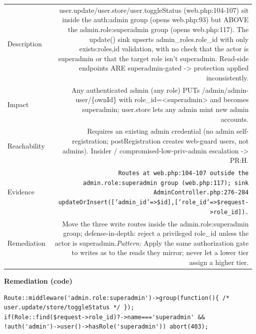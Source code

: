 \documentclass[11pt,a4paper]{article}
\begin{document}
{\renewcommand{\arraystretch}{1.35}%
\begin{tabularx}{\textwidth}{L R}
\toprule
Description & user.update/user.store/user.toggleStatus (web.php:104-107) sit inside the auth:admin group (opens web.php:93) but ABOVE the admin.role:superadmin group (opens web.php:117). The update() sink upserts admin\_roles.role\_id with only exists:roles,id validation, with no check that the actor is superadmin or that the target role isn't superadmin. Read-side endpoints ARE superadmin-gated -\textgreater{} protection applied inconsistently. \\
Impact & Any authenticated admin (any role) PUTs /admin/admin-user/\{ownId\} with role\_id=\textless{}superadmin\textgreater{} and becomes superadmin; user.store lets any admin mint new admin accounts. \\
Reachability & Requires an existing admin credential (no admin self-registration; postRegistration creates web-guard users, not admins). Insider / compromised-low-priv-admin escalation -\textgreater{} PR:H. \\
Evidence & \texttt{\small Routes at web.php:104-107 outside the admin.role:superadmin group (web.php:117); sink AdminController.php:276-284 updateOrInsert(['admin\_id'=\textgreater{}\$id],['role\_id'=\textgreater{}\$request-\textgreater{}role\_id]).} \\
Remediation & Move the three write routes inside the admin.role:superadmin group; defense-in-depth: reject a privileged role\_id unless the actor is superadmin.\newline\emph{Pattern:} Apply the same authorization gate to writes as to the reads they mirror; never let a lower tier assign a higher tier. \\
\bottomrule
\end{tabularx}}

\vspace{4pt}\noindent\textbf{Remediation (code)}\par
\begin{lstlisting}
Route::middleware('admin.role:superadmin')->group(function(){ /* user.update/store/toggleStatus */ });
if(Role::find($request->role_id)?->name==='superadmin' && !auth('admin')->user()->hasRole('superadmin')) abort(403);
\end{lstlisting}
\end{document}
